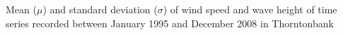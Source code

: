 \label{fig:windwave}
Mean ($\mu$) and standard deviation ($\sigma$) of wind speed and wave height of time series recorded between January 1995 and December 2008 in Thorntonbank